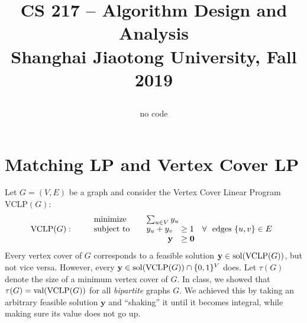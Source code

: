 \documentclass[12pt,a4]{article}
\begin{document}
\date{}

\title{CS 217 -- Algorithm Design and Analysis \\ 
  \vspace{3mm}
{\large	Shanghai Jiaotong University, Fall 2019\\
}
\author{no code}
}
\maketitle

\noindent


\newcommand{\rank}{\textnormal{rank}}
\newcommand{\y}{\mathbf{y}}
\renewcommand{\c}{\mathbf{c}}
\newcommand{\x}{\mathbf{x}}
\newcommand{\z}{\mathbf{z}}
\renewcommand{\u}{\mathbf{u}}
\newcommand{\V}{\mathbf{v}}
\newcommand{\val}{\textnormal{val}}

\renewcommand{\a}{\mathbf{a}}

\renewcommand{\b}{\mathbf{b}} 
\newcommand{\zero}{\mathbf{0}}
\newcommand{\rpn}{\mathbb{R}_{\geq 0}}
\newcommand{\sol}{\textup{\textrm{sol}}}
\newcommand{\opt}{\textup{\textrm{opt}}}
\setcounter{section}{5}


\section{Matching LP and Vertex Cover LP}


Let $G=(V,E)$ be a 
graph and consider the Vertex Cover Linear Program $\textrm{VCLP}(G)$:
\begin{align*}
  \textrm{VCLP($G$)}: \qquad
  \begin{array}{lrl}
    \textnormal{minimize} \quad & \multicolumn{2}{l}{\sum_{u \in V} y_u} \\
    \textnormal{subject to} \quad & y_u + y_v  & \geq 1 \quad \forall\ \textnormal{ edges } \{u,v\} \in E\\
     & \y & \geq \mathbf{0}  
  \end{array}
\end{align*}
Every vertex cover of $G$ corresponds to a feasible solution $\y \in \sol(\textrm{VCLP}(G))$, but not 
vice versa. However, every $\y \in \sol(\textrm{VCLP}(G)) \cap \{0,1\}^V$ does.
Let $\tau(G)$ denote the size of a minimum vertex cover of $G$. In class, we showed that
$\tau(G) = \val(\textrm{VCLP}(G))$ for all {\em bipartite} graphs $G$. We achieved this by taking
an arbitrary feasible solution $\y$ and ``shaking'' it until it becomes integral, while making sure
its value does not go up.\\
\end{document}
